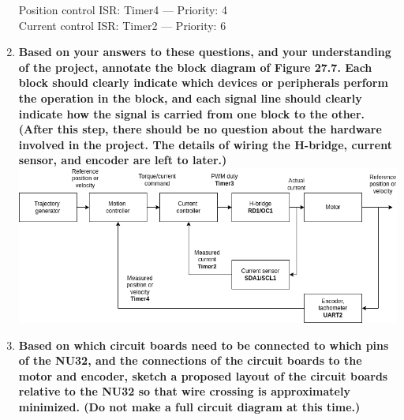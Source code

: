 \documentclass{article}
\begin{document}
\begin{enumerate}[label=\textbf{\arabic*})]
    Position control ISR: Timer4 --- Priority: 4 \\

    Current control ISR: Timer2 --- Priority: 6 \\

    \pagebreak
    \item \textbf{Based on your answers to these questions, and your understanding of the project, annotate
    the block diagram of Figure 27.7. Each block should clearly indicate which devices or
    peripherals perform the operation in the block, and each signal line should clearly indicate
    how the signal is carried from one block to the other. (After this step, there should be no
    question about the hardware involved in the project. The details of wiring the H-bridge,
    current sensor, and encoder are left to later.)} \\

        \includegraphics[width=\linewidth]{block_diagram.png}

    \pagebreak
    \item \textbf{Based on which circuit boards need to be connected to which pins of the NU32, and the
    connections of the circuit boards to the motor and encoder, sketch a proposed layout of the
    circuit boards relative to the NU32 so that wire crossing is approximately minimized. (Do
    not make a full circuit diagram at this time.)} \\


\end{enumerate}
\end{document}
